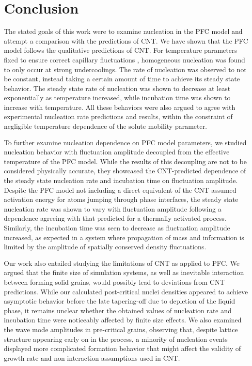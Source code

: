 \chapter{\sf Conclusion}\label{ch:conclusion}

The stated goals of this work were to examine nucleation in the PFC model and attempt a comparison with the predictions of CNT. We have shown that the PFC model follows the qualitative predictions of CNT. For temperature parameters fixed to ensure correct capillary fluctuations \cite{kocher16}, homogeneous nucleation was found to only occur at strong undercoolings. The rate of nucleation was observed to not be constant, instead taking a certain amount of time to achieve its steady state behavior. The steady state rate of nucleation was shown to decrease at least exponentially as temperature increased, while incubation time was shown to increase with temperature. All these behaviors were also argued to agree with experimental nucleation rate predictions and results, within the constraint of negligible temperature dependence of the solute mobility parameter.

To further examine nucleation dependence on PFC model parameters, we studied nucleation behavior with fluctuation amplitude decoupled from the effective temperature of the PFC model. While the results of this decoupling are not to be considered physically accurate, they showcased the CNT-predicted dependence of the steady state nucleation rate and incubation time on fluctuation amplitude. Despite the PFC model not including a direct equivalent of the CNT-assumed activation energy for atoms jumping through phase interfaces, the steady state nucleation rate was shown to vary with fluctuation amplitude following a dependence agreeing with that predicted for a thermally activated process. Similarly, the incubation time was seen to decrease as fluctuation amplitude increased, as expected in a system where propagation of mass and information is limited by the amplitude of spatially conserved density fluctuations. 

Our work also entailed studying the limitations of CNT as applied to PFC. We argued that the finite size of simulation systems, as well as inevitable interaction between forming solid grains, would possibly lead to deviations from CNT predictions. While our calculated post-critical nuclei densities appeared to achieve asymptotic behavior before the late tapering-off due to depletion of the liquid phase, it remains unclear whether the obtained values of nucleation rate and incubation time were noticeably affected by finite size effects. We also examined the wave mode amplitudes in pre-critical grains, observing that, despite lattice structure appearing early on in the process, a minority of nucleation events displayed more complicated formation behavior that might affect the validity of growth rate and non-interaction assumptions used in CNT.

